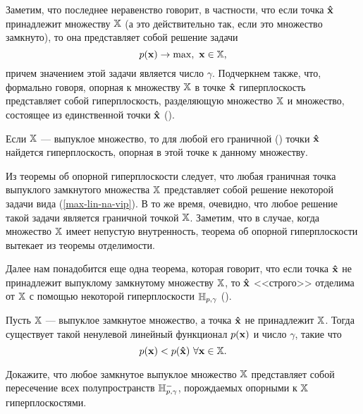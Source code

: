     Заметим, что последнее неравенство говорит, в частности, что
    если точка $\mathbf{\hat{x}}$  принадлежит множеству $\mathbb{X}$
    (а это действительно так, если это множество замкнуто),
    то она  представляет собой решение задачи
\begin{equation}
    \label{max-lin-na-vip}
    p(\mathbf{x})\rightarrow\max, \ \mathbf{x}\in\mathbb{X},
\end{equation}
    причем значением этой задачи является число $\gamma$. Подчеркнем также,
    что, формально говоря, опорная к множеству $\mathbb{X}$
    в точке $\mathbf{\hat{x}}$ гиперплоскость представляет собой
    гиперплоскость, разделяющую множество $\mathbb{X}$ и множество,
    состоящее из единственной точки $\mathbf{\hat{x}}$ ().

\begin{teo}
    \label{teo-op-gip}
    Если $\mathbb{X}$ --- выпуклое множество, то для любой его граничной ()
    точки $\mathbf{\hat{x}}$  найдется гиперплоскость, опорная в этой точке
    к данному множеству.
\end{teo}

    Из теоремы об опорной гиперплоскости следует, что любая
    граничная точка выпуклого замкнутого множества $\mathbb{X}$ представляет
    собой решение некоторой задачи вида (\ref{max-lin-na-vip}). В то
    же время, очевидно, что любое решение такой задачи является
    граничной точкой $\mathbb{X}$. Заметим, что в случае, когда
    множество $\mathbb{X}$ имеет непустую внутренность, теорема об
    опорной гиперплоскости вытекает из теоремы отделимости.

    Далее нам понадобится еще одна теорема, которая говорит, что
    если точка $\mathbf{\hat{x}}$ не принадлежит выпуклому замкнутому
    множеству $\mathbb{X}$, то $\mathbf{\hat{x}}$ <<строго>> отделима от
    $\mathbb{X}$ с помощью некоторой гиперплоскости $\mathbb{H}_{p,\gamma}$ ().


\begin{teo}\label{strog-otdotochki}
    Пусть $\mathbb{X}$ --- выпуклое замкнутое множество, а точка
    $\mathbf{\hat{x}}$  не принадлежит $\mathbb{X}$. Тогда существует такой
    ненулевой линейный функционал $p(\mathbf{x})$ и число
     $\gamma$, такие что
    \[p(\vc{x})<p(\vc{\hat{x}}) \ \forall \vc{x}\in\st{X}.\]
\end{teo}

\begin{exer}
    Докажите, что любое замкнутое выпуклое множество $\mathbb{X}$ представляет
    собой пересечение всех полупространств
    $\mathbb{H}_{p,\gamma}^{-}$, порождаемых опорными к $\mathbb{X}$
    гиперплоскостями.


\end{exer}


